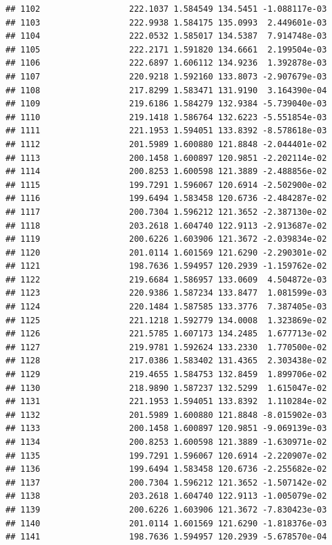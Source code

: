 \documentclass[
]{article}
\begin{document}
\begin{verbatim}
## 1102                  222.1037 1.584549 134.5451 -1.088117e-03
## 1103                  222.9938 1.584175 135.0993  2.449601e-03
## 1104                  222.0532 1.585017 134.5387  7.914748e-03
## 1105                  222.2171 1.591820 134.6661  2.199504e-03
## 1106                  222.6897 1.606112 134.9236  1.392878e-03
## 1107                  220.9218 1.592160 133.8073 -2.907679e-03
## 1108                  217.8299 1.583471 131.9190  3.164390e-04
## 1109                  219.6186 1.584279 132.9384 -5.739040e-03
## 1110                  219.1418 1.586764 132.6223 -5.551854e-03
## 1111                  221.1953 1.594051 133.8392 -8.578618e-03
## 1112                  201.5989 1.600880 121.8848 -2.044401e-02
## 1113                  200.1458 1.600897 120.9851 -2.202114e-02
## 1114                  200.8253 1.600598 121.3889 -2.488856e-02
## 1115                  199.7291 1.596067 120.6914 -2.502900e-02
## 1116                  199.6494 1.583458 120.6736 -2.484287e-02
## 1117                  200.7304 1.596212 121.3652 -2.387130e-02
## 1118                  203.2618 1.604740 122.9113 -2.913687e-02
## 1119                  200.6226 1.603906 121.3672 -2.039834e-02
## 1120                  201.0114 1.601569 121.6290 -2.290301e-02
## 1121                  198.7636 1.594957 120.2939 -1.159762e-02
## 1122                  219.6684 1.586957 133.0609  4.504872e-03
## 1123                  220.9386 1.587234 133.8477  1.081599e-03
## 1124                  220.1484 1.587585 133.3776  7.387405e-03
## 1125                  221.1218 1.592779 134.0008  1.323869e-02
## 1126                  221.5785 1.607173 134.2485  1.677713e-02
## 1127                  219.9781 1.592624 133.2330  1.770500e-02
## 1128                  217.0386 1.583402 131.4365  2.303438e-02
## 1129                  219.4655 1.584753 132.8459  1.899706e-02
## 1130                  218.9890 1.587237 132.5299  1.615047e-02
## 1131                  221.1953 1.594051 133.8392  1.110284e-02
## 1132                  201.5989 1.600880 121.8848 -8.015902e-03
## 1133                  200.1458 1.600897 120.9851 -9.069139e-03
## 1134                  200.8253 1.600598 121.3889 -1.630971e-02
## 1135                  199.7291 1.596067 120.6914 -2.220907e-02
## 1136                  199.6494 1.583458 120.6736 -2.255682e-02
## 1137                  200.7304 1.596212 121.3652 -1.507142e-02
## 1138                  203.2618 1.604740 122.9113 -1.005079e-02
## 1139                  200.6226 1.603906 121.3672 -7.830423e-03
## 1140                  201.0114 1.601569 121.6290 -1.818376e-03
## 1141                  198.7636 1.594957 120.2939 -5.678570e-04

\end{verbatim}
\end{document}
